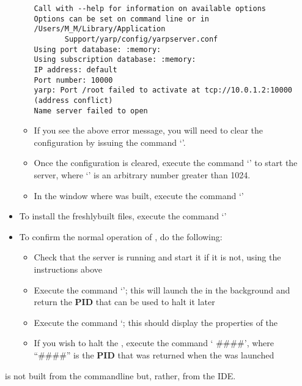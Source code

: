 \begin{itemize}
\begin{itemize}
\begin{verbatim}
Call with --help for information on available options
Options can be set on command line or in /Users/M_M/Library/Application
       Support/yarp/config/yarpserver.conf
Using port database: :memory:
Using subscription database: :memory:
IP address: default
Port number: 10000
yarp: Port /root failed to activate at tcp://10.0.1.2:10000 (address conflict)
Name server failed to open
\end{verbatim}
\outputEnd
\item\exSp{}If you see the above error message, you will need to clear the \yarp{}
configuration by issuing the command `'.
\item\exSp{}Once the \yarp{} configuration is cleared, execute the command
`' to start the \yarp{}
server, where `' is an arbitrary number greater than 1024.
\item\exSp{}In the  window where \mplusm{} was built, execute the command
`'
\end{itemize}
\item\exSp{}To install the freshly\longDash{}built \mplusm{} files, execute the command
`'
\item\exSp{}To confirm the normal operation of \mplusm, do the following:
\begin{itemize}
\item Check that the \yarp{} server is running and start it if it is not, using the
instructions above
\item\exSp{}Execute the command `'; this will launch the
 in the background and return the \textbf{PID} that can
be used to halt it later
\item\exSp{}Execute the command `; this should display the
properties of the 
\item\exSp{}If you wish to halt the , execute the
command ` \#\#\#\#', where ``\#\#\#\#'' is the \textbf{PID} that was
returned when the  was launched
\end{itemize}
\end{itemize}
\tertiaryEnd
\secondaryEnd
{}
\textit{\MMMU} is not built from the command\longDash{}line but, rather, from the IDE.
